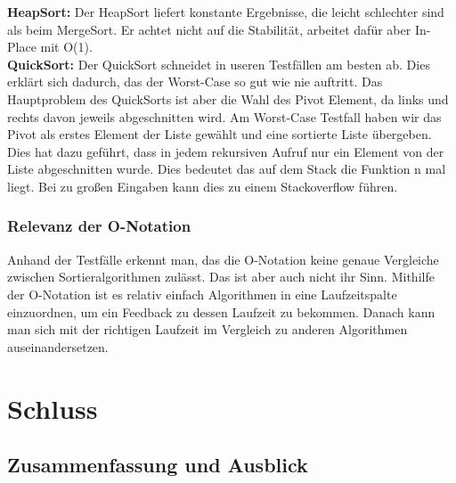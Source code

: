 \documentclass{article}
\begin{document}
\textbf{HeapSort:} Der HeapSort liefert konstante Ergebnisse, die leicht schlechter sind als beim MergeSort. Er achtet nicht auf die Stabilität, arbeitet dafür aber In-Place mit O(1).\\

\textbf{QuickSort:} Der QuickSort schneidet in useren Testfällen am besten ab. Dies erklärt sich dadurch, das der Worst-Case so gut wie nie auftritt. Das Hauptproblem des QuickSorts ist aber die Wahl des Pivot Element, da links und rechts davon jeweils abgeschnitten wird. Am Worst-Case Testfall haben wir das Pivot als erstes Element der Liste gewählt und eine sortierte Liste übergeben. Dies hat dazu geführt, dass in jedem rekursiven Aufruf nur ein Element von der Liste abgeschnitten wurde. Dies bedeutet das auf dem Stack die Funktion n mal liegt. Bei zu großen Eingaben kann dies zu einem Stackoverflow führen. \\






\subsubsection{Relevanz der O-Notation}
Anhand der Testfälle erkennt man, das die O-Notation keine genaue Vergleiche zwischen Sortieralgorithmen zulässt. Das ist aber auch nicht ihr Sinn. Mithilfe der O-Notation ist es relativ einfach Algorithmen in eine Laufzeitspalte einzuordnen, um ein Feedback zu dessen Laufzeit zu bekommen. Danach kann man sich mit der richtigen Laufzeit im Vergleich zu anderen Algorithmen auseinandersetzen.


\section{Schluss}
\subsection{Zusammenfassung und Ausblick}
\end{document}
